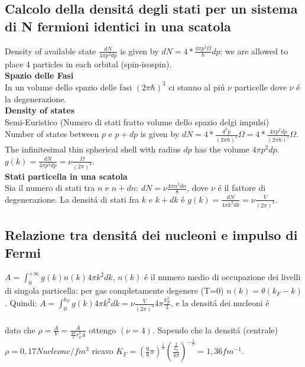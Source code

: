 \subsection{Calcolo della densit\'a degli stati per un sistema di N fermioni identici in una scatola}
Density of available state $\frac{dN}{4\pi p^2dp}$ is given by $dN=4*\frac{4\pi p^2\Omega}{h}dp$: we are allowed to place 4 particles in each orbital (spin-isospin).\\
\textbf{Spazio delle Fasi}\\
In un volume dello spazio delle fasi $(2\pi\hbar)^3$ ci stanno al pi\'u $\nu$ particelle dove $\nu$ \'e la degenerazione.\\
\textbf{Density of states}\\
Semi-Euristico (Numero di stati fratto volume dello spazio delgi impulsi)\\
Number of states between $p$ e $p+dp$ is given by $dN=4*\frac{d^3p}{(2\pi\hbar)^3}\Omega=4*\frac{4\pi p^2dp}{(2\pi\hbar)^3}\Omega$.\\
The infinitesimal thin spherical shell with radius $dp$ has the volume $4\pi p^2dp$.\\
$g(k)=\frac{dN}{4\pi p^2dp}=\nu\frac{\Omega}{(2\pi)^3}$.\\

\textbf{Stati particella in una scatola}\\
Sia il numero di stati tra $n$ e $n+dn$: $dN=\nu \frac{4\pi n^2dn}{8}$, dove $\nu$ \'e il fattore di degenerazione. La densit\'a di stati fra $k$ e $k+dk$ \'e $g(k)=\frac{dN}{4\pi k^2dk}=\nu \frac{V}{(2\pi)^3}$.\\

\subsection{Relazione tra densit\'a dei nucleoni e impulso di Fermi}
$A=\int_0^{+\infty}g(k)n(k)4\pi k^2dk$, $n(k)$ \'e il numero medio di occupazione dei livelli di singola particella: per gas completamente degenere (T=0)    
 $n(k)=\theta (k_F-k)$. Quindi: $A=\int_0^{k_F}g(k)4\pi k^2dk=\nu \frac{V}{(2\pi)^3}4\pi \frac{k_F^3}{3}$, e la densit\'a dei nucleoni \'e\\
\\
dato che $\rho=\frac{A}{V}=\frac{A}{\frac{4\pi}{3}r_0^3A}$ ottengo  $(\nu=4)$.
Sapendo che la densit\'a (centrale) $\rho=0,17 Nucleone/fm^3$ ricavo $K_F=(\frac{9}{8}\pi)^{\frac{1}{3}}(\frac{\frac{3}{\rho_0}}{4\pi})^{-\frac{1}{3}}=1,36 fm^{-1}$.

